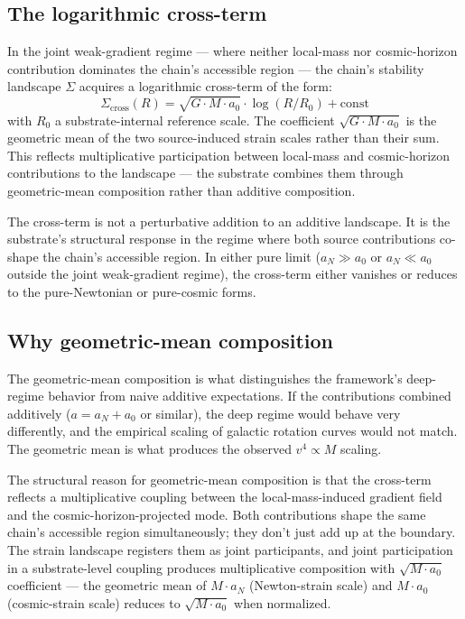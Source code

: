 \documentclass[11pt,a4paper]{article}
\begin{document}
\subsection{The logarithmic cross-term}

In the joint weak-gradient regime --- where neither local-mass nor cosmic-horizon contribution dominates the chain's accessible region --- the chain's stability landscape $\Sigma$ acquires a logarithmic cross-term of the form:
\[
\Sigma_{\mathrm{cross}}(R) = \sqrt{G \cdot M \cdot a_{0}} \cdot \log(R/R_0) + \mathrm{const}
\]
with $R_0$ a substrate-internal reference scale. The coefficient $\sqrt{G\cdot M\cdot a_0}$ is the geometric mean of the two source-induced strain scales rather than their sum. This reflects multiplicative participation between local-mass and cosmic-horizon contributions to the landscape --- the substrate combines them through geometric-mean composition rather than additive composition.

The cross-term is not a perturbative addition to an additive landscape. It is the substrate's structural response in the regime where both source contributions co-shape the chain's accessible region. In either pure limit ($a_N \gg a_0$ or $a_N \ll a_0$ outside the joint weak-gradient regime), the cross-term either vanishes or reduces to the pure-Newtonian or pure-cosmic forms.

\subsection{Why geometric-mean composition}

The geometric-mean composition is what distinguishes the framework's deep-regime behavior from naive additive expectations. If the contributions combined additively ($a = a_N + a_0$ or similar), the deep regime would behave very differently, and the empirical scaling of galactic rotation curves would not match. The geometric mean is what produces the observed $v^4 \propto M$ scaling.

The structural reason for geometric-mean composition is that the cross-term reflects a multiplicative coupling between the local-mass-induced gradient field and the cosmic-horizon-projected mode. Both contributions shape the same chain's accessible region simultaneously; they don't just add up at the boundary. The strain landscape registers them as joint participants, and joint participation in a substrate-level coupling produces multiplicative composition with $\sqrt{M\cdot a_0}$ coefficient --- the geometric mean of $M\cdot a_N$ (Newton-strain scale) and $M\cdot a_0$ (cosmic-strain scale) reduces to $\sqrt{M\cdot a_0}$ when normalized.
\end{document}
